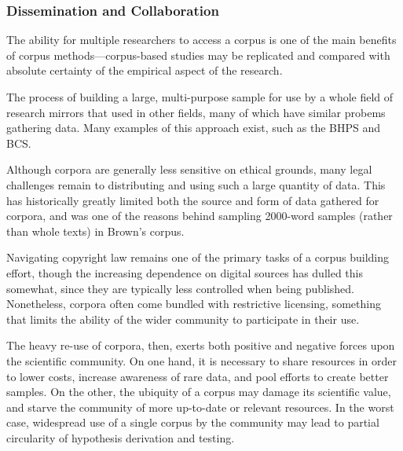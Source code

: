 






\subsubsection{Dissemination and Collaboration}
The ability for multiple researchers to access a corpus is one of the main benefits of corpus methods---corpus-based studies may be replicated and compared with absolute certainty of the empirical aspect of the research.

The process of building a large, multi-purpose sample for use by a whole field of research mirrors that used in other fields, many of which have similar probems gathering data.  Many examples of this approach exist, such as the BHPS and BCS\cite{taylor1996british,hough1983british}.

Although corpora are generally less sensitive on ethical grounds, many legal challenges remain to distributing and using such a large quantity of data.  This has historically greatly limited both the source and form of data gathered for corpora, and was one of the reasons behind sampling 2000-word samples (rather than whole texts) in Brown's corpus.

Navigating copyright law remains one of the primary tasks of a corpus building effort, though the increasing dependence on digital sources has dulled this somewhat, since they are typically less controlled when being published.  Nonetheless, corpora often come bundled with restrictive licensing, something that limits the ability of the wider community to participate in their use.






The heavy re-use of corpora, then, exerts both positive and negative forces upon the scientific community.  On one hand, it is necessary to share resources in order to lower costs, increase awareness of rare data, and pool efforts to create better samples.  On the other, the ubiquity of a corpus may damage its scientific value, and starve the community of more up-to-date or relevant resources.  In the worst case, widespread use of a single corpus by the community may lead to partial circularity of hypothesis derivation and testing.

